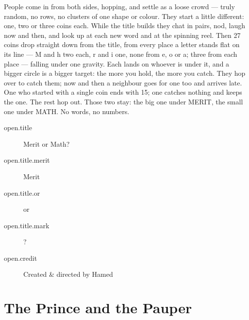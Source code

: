 
\label{crowd}

People come in from both sides, hopping, and settle as a loose crowd —
truly random, no rows, no clusters of one shape or colour. They start a
little different: one, two or three coins each. While the title builds they
chat in pairs, nod, laugh now and then, and look up at each new word and at
the spinning reel. Then 27 coins drop straight down from the title, from
every place a letter stands flat on its line — M and h two each, r and i
one, none from e, o or a; three from each place — falling under one
gravity. Each lands on whoever is under it, and a bigger circle is a bigger
target: the more you hold, the more you catch. They hop over to catch them;
now and then a neighbour goes for one too and arrives late. One who started
with a single coin ends with 15; one catches nothing and keeps the one. The
rest hop out. Those two stay: the big one under MERIT, the small one under
MATH. No words, no numbers.


\begin{description}
  \item[open.title] Merit or Math?
  \item[open.title.merit] Merit
  \item[open.title.or] or
  \item[open.title.mark] ?
  \item[open.credit] Created \& directed by Hamed
\end{description}





\chapter{The Prince and the Pauper}\label{chapter:prince-and-pauper}

